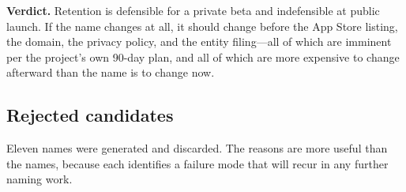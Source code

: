 \documentclass[11pt,a4paper]{article}
\begin{document}
\textbf{Verdict.} Retention is defensible for a private beta and
indefensible at public launch. If the name changes at all, it should
change before the App Store listing, the domain, the privacy policy,
and the entity filing---all of which are imminent per the project's own
90-day plan, and all of which are more expensive to change afterward
than the name is to change now.

\subsection{Rejected candidates}
\label{sec:rejected}

Eleven names were generated and discarded. The reasons are more useful
than the names, because each identifies a failure mode that will recur
in any further naming work.
\end{document}
